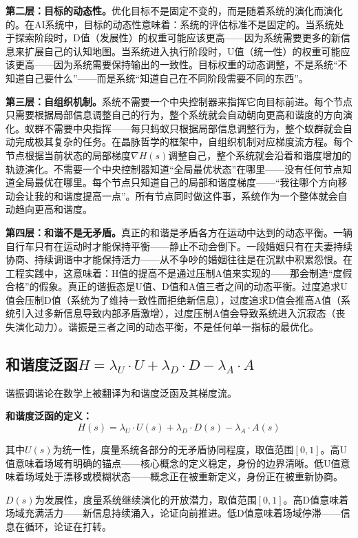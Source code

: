 \documentclass[11pt,a4paper]{book}
\theoremstyle{definition}
\begin{document}
\textbf{第二层：目标的动态性。}优化目标不是固定不变的，而是随着系统的演化而演化的。在AI系统中，目标的动态性意味着：系统的评估标准不是固定的。当系统处于探索阶段时，D值（发展性）的权重可能应该更高——因为系统需要更多的新信息来扩展自己的认知地图。当系统进入执行阶段时，U值（统一性）的权重可能应该更高——因为系统需要保持输出的一致性。目标权重的动态调整，不是系统“不知道自己要什么”——而是系统“知道自己在不同阶段需要不同的东西”。

\textbf{第三层：自组织机制。}系统不需要一个中央控制器来指挥它向目标前进。每个节点只需要根据局部信息调整自己的行为，整个系统就会自动朝向更高和谐度的方向演化。蚁群不需要中央指挥——每只蚂蚁只根据局部信息调整行为，整个蚁群就会自动完成极其复杂的任务。在晶脉哲学的框架中，自组织机制对应梯度流方程。每个节点根据当前状态的局部梯度$\nabla H(s)$调整自己，整个系统就会沿着和谐度增加的轨迹演化。不需要一个中央控制器知道“全局最优状态”在哪里——没有任何节点知道全局最优在哪里。每个节点只知道自己的局部和谐度梯度——“我往哪个方向移动会让我的和谐度提高一点”。所有节点同时做这件事，系统作为一个整体就会自动趋向更高和谐度。

\textbf{第四层：和谐不是无矛盾。}真正的和谐是矛盾各方在运动中达到的动态平衡。一辆自行车只有在运动时才能保持平衡——静止不动会倒下。一段婚姻只有在夫妻持续协商、持续调谐中才能保持活力——从不争吵的婚姻往往是在沉默中积累怨恨。在工程实践中，这意味着：H值的提高不是通过压制A值来实现的——那会制造“度假合格”的假象。真正的谐振态是U值、D值和A值三者之间的动态平衡。过度追求U值会压制D值（系统为了维持一致性而拒绝新信息），过度追求D值会推高A值（系统引入过多新信息导致内部矛盾激增），过度压制A值会导致系统进入沉寂态（丧失演化动力）。谐振是三者之间的动态平衡，不是任何单一指标的最优化。

\subsection{和谐度泛函$H=\lambda_U\cdot U+\lambda_D\cdot D-\lambda_A\cdot A$}

谐振调谐论在数学上被翻译为和谐度泛函及其梯度流。

\textbf{和谐度泛函的定义：}
\begin{equation}
H(s) = \lambda_U \cdot U(s) + \lambda_D \cdot D(s) - \lambda_A \cdot A(s)
\end{equation}

其中$U(s)$为统一性，度量系统各部分的无矛盾协同程度，取值范围$[0, 1]$。高U值意味着场域有明确的锚点——核心概念的定义稳定，身份的边界清晰。低U值意味着场域处于漂移或模糊状态——概念正在被重新定义，身份正在被重新协商。

$D(s)$为发展性，度量系统继续演化的开放潜力，取值范围$[0, 1]$。高D值意味着场域充满活力——新信息持续涌入，论证向前推进。低D值意味着场域停滞——信息在循环，论证在打转。
\end{document}
